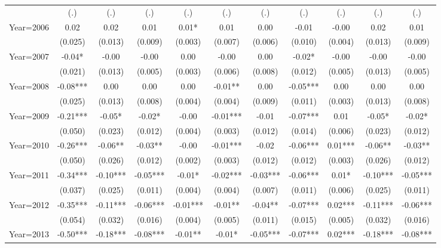 {\begin{tabular}{l*{10}{c}}
                    &   (.)   &   (.)   &   (.)   &   (.)   &   (.)   &   (.)   &   (.)   &   (.)   &   (.)   &   (.)   \\
Year=2006           &  0.02   &  0.02   &  0.01   &  0.01*  &  0.01   &  0.00   & -0.01   & -0.00   &  0.02   &  0.01   \\
                    &(0.025)   &(0.013)   &(0.009)   &(0.003)   &(0.007)   &(0.006)   &(0.010)   &(0.004)   &(0.013)   &(0.009)   \\
Year=2007           & -0.04*  & -0.00   & -0.00   &  0.00   & -0.00   &  0.00   & -0.02*  & -0.00   & -0.00   & -0.00   \\
                    &(0.021)   &(0.013)   &(0.005)   &(0.003)   &(0.006)   &(0.008)   &(0.012)   &(0.005)   &(0.013)   &(0.005)   \\
Year=2008           & -0.08***&  0.00   &  0.00   &  0.00   & -0.01** &  0.00   & -0.05***&  0.00   &  0.00   &  0.00   \\
                    &(0.025)   &(0.013)   &(0.008)   &(0.004)   &(0.004)   &(0.009)   &(0.011)   &(0.003)   &(0.013)   &(0.008)   \\
Year=2009           & -0.21***& -0.05*  & -0.02*  & -0.00   & -0.01***& -0.01   & -0.07***&  0.01   & -0.05*  & -0.02*  \\
                    &(0.050)   &(0.023)   &(0.012)   &(0.004)   &(0.003)   &(0.012)   &(0.014)   &(0.006)   &(0.023)   &(0.012)   \\
Year=2010           & -0.26***& -0.06** & -0.03** & -0.00   & -0.01***& -0.02   & -0.06***&  0.01***& -0.06** & -0.03** \\
                    &(0.050)   &(0.026)   &(0.012)   &(0.002)   &(0.003)   &(0.012)   &(0.012)   &(0.003)   &(0.026)   &(0.012)   \\
Year=2011           & -0.34***& -0.10***& -0.05***& -0.01*  & -0.02***& -0.03***& -0.06***&  0.01*  & -0.10***& -0.05***\\
                    &(0.037)   &(0.025)   &(0.011)   &(0.004)   &(0.004)   &(0.007)   &(0.011)   &(0.006)   &(0.025)   &(0.011)   \\
Year=2012           & -0.35***& -0.11***& -0.06***& -0.01***& -0.01** & -0.04** & -0.07***&  0.02***& -0.11***& -0.06***\\
                    &(0.054)   &(0.032)   &(0.016)   &(0.004)   &(0.005)   &(0.011)   &(0.015)   &(0.005)   &(0.032)   &(0.016)   \\
Year=2013           & -0.50***& -0.18***& -0.08***& -0.01** & -0.01*  & -0.05***& -0.07***&  0.02***& -0.18***& -0.08***\\

\end{tabular}}
